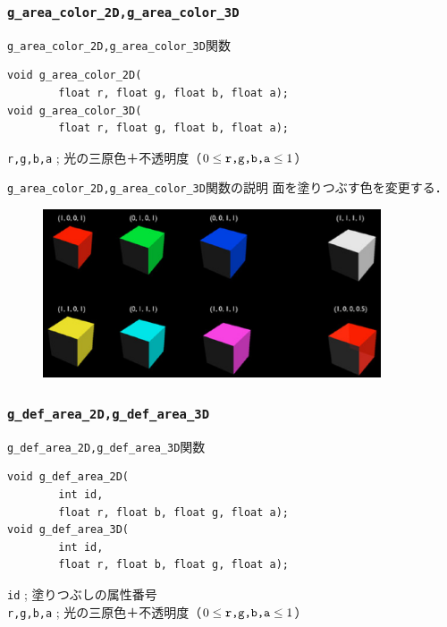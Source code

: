 \documentclass[platex,a4paper,12pt]{jsarticle}%
\begin{document}
\clearpage
\subsubsection{\texttt{g\_area\_color\_2D,g\_area\_color\_3D}}

\begin{itembox}[l]{\texttt{g\_area\_color\_2D,g\_area\_color\_3D}関数}
\begin{verbatim}
void g_area_color_2D(
        float r, float g, float b, float a);
void g_area_color_3D(
        float r, float g, float b, float a);
\end{verbatim}
\verb|r,g,b,a| ; 光の三原色＋不透明度（$0\leq \verb|r,g,b,a| \leq 1$）
\end{itembox}

\begin{itembox}[l]{\texttt{g\_area\_color\_2D,g\_area\_color\_3D}関数の説明}
面を塗りつぶす色を変更する．
\end{itembox}

\begin{figure}[htb]
\centering
\includegraphics[width=100mm]{./Figures/eps/Canvas_g_area_color.eps}
\end{figure}

\clearpage
\subsubsection{\texttt{g\_def\_area\_2D,g\_def\_area\_3D}}

\begin{itembox}[l]{\texttt{g\_def\_area\_2D,g\_def\_area\_3D}関数}
\begin{verbatim}
void g_def_area_2D(
        int id,	
        float r, float b, float g, float a);
void g_def_area_3D(
        int id,	
        float r, float b, float g, float a);
\end{verbatim}
\verb|id| ; 塗りつぶしの属性番号\\
\verb|r,g,b,a| ; 光の三原色＋不透明度（$0\leq \verb|r,g,b,a| \leq 1$）
\end{itembox}
\end{document}
